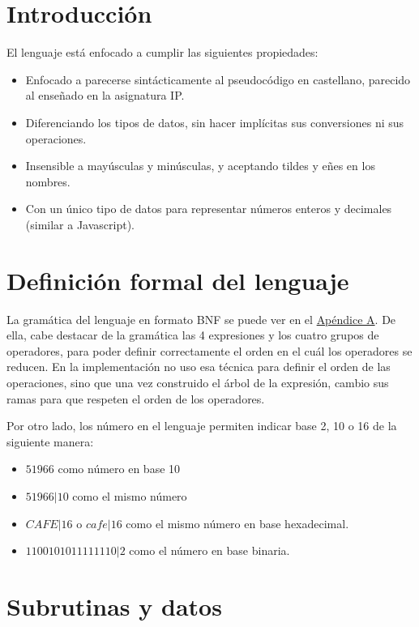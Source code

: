 \documentclass{report}
\begin{document}
	\section{Introducción}
	El lenguaje está enfocado a cumplir las siguientes propiedades:
	
	\begin{itemize}
		\item Enfocado a parecerse sintácticamente al pseudocódigo en castellano, parecido al enseñado en la asignatura IP.
		\item Diferenciando los tipos de datos, sin hacer implícitas sus conversiones ni sus operaciones.
		\item Insensible a mayúsculas y minúsculas, 
		y aceptando tildes y eñes en los nombres.
		\item Con un único tipo de datos para representar números enteros y decimales (similar a Javascript).
	\end{itemize}
	
	\section{Definición formal del lenguaje}
	La gramática del lenguaje en formato BNF se puede ver en el \hyperref[app:a]{Apéndice A}. De ella, cabe destacar de la gramática las 4 expresiones y los cuatro grupos de operadores, para poder definir correctamente el orden en el cuál los operadores se reducen. En la implementación no uso esa técnica para definir el orden de las operaciones, sino que una vez construido el árbol de la expresión, cambio sus ramas para que respeten el orden de los operadores. 
	
	\hfill
	
	Por otro lado, los número en el lenguaje permiten indicar base 2, 10 o 16 de la siguiente manera:
	
	\begin{itemize}
		\item $51966$ como número en base 10
		\item $51966|10$ como el mismo número
		\item $CAFE|16$ o $cafe|16$ como el mismo número en base hexadecimal.
		\item $1100101011111110|2$ como el número en base binaria.
	\end{itemize}
	
	\section{Subrutinas y datos}
	
\end{document}
